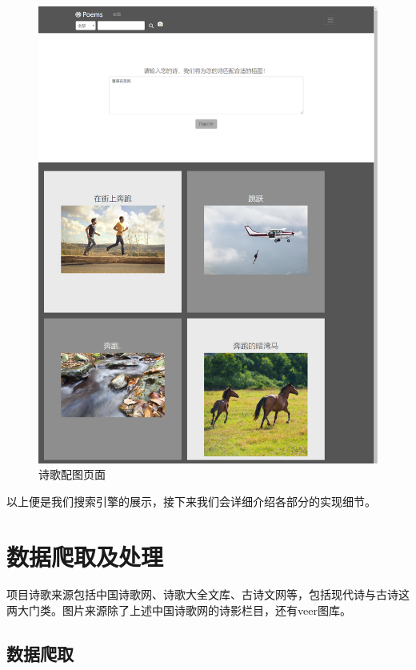 \documentclass[a4paper, 10pt]{article}
\begin{document}
\begin{figure}[H]
\centering
\includegraphics[scale=0.48]{fig/demo_matchimage.png}
\caption{诗歌配图页面}
\label{fig:demo_matchimage}
\end{figure}

以上便是我们搜索引擎的展示，接下来我们会详细介绍各部分的实现细节。

\section{数据爬取及处理}
项目诗歌来源包括中国诗歌网、诗歌大全文库、古诗文网等，包括现代诗与古诗这两大门类。图片来源除了上述中国诗歌网的诗影栏目，还有veer图库。

\subsection{数据爬取}
\end{document}
